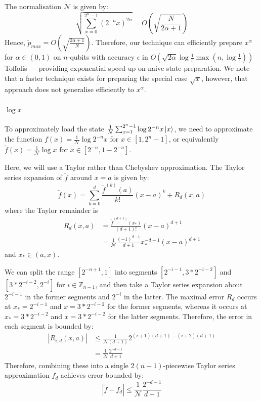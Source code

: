 The normalisation $\mathcal{N}$ is given by:
\begin{equation}
    \sqrt{\sum_{x=0}^{2^n-1}(2^{-n} x)^{2\alpha}}  = O\left(\sqrt{\frac{N}{2\alpha+1}}\right)
\end{equation}
Hence, $\tilde{p}_{max} = O\left(\sqrt{\frac{2\alpha+1}{N}
}\right)$. Therefore, our technique can efficiently prepare $x^{\alpha}$ for $\alpha \in (0,1)$ on $n$-qubits with accuracy $\epsilon$ in $O(\sqrt{2\alpha} \log \frac{1}{\epsilon}\max(n, \log\frac{1}{\epsilon}))$ Toffolis --- providing exponential speed-up on naive state preparation. We note that a faster technique \cite{PhysRevLett.122.020502} exists for preparing the special case $\sqrt{x}$, however, that approach does not generalise efficiently to $x^{\alpha}$.

\paragraph{$\log x$}
\label{section:inverse} To approximately load the state $\frac{1}{\mathcal{N}}\sum_{x=1}^{2^n-1} \log{2^{-n}x}\ket{x}$, we need to approximate the function $f(x) = \frac{1}{\mathcal{N}}\log{2^{-n}x}$ for $x \in [1, 2^n-1]$, or equivalently $\tilde f(x) =\frac{1}{\mathcal{N}}\log{x}$ for $x \in [2^{-n}, 1-2^{-n}]$. 

Here, we will use a Taylor rather than Chebyshev approximation. The Taylor series expansion of $\tilde f$ around $x=a$ is given by:
\begin{equation}
        \tilde f(x) = \sum_{k=0}^d \frac{\tilde{f}^{(k)}(a)}{k!}(x-a)^k + R_d(x,a)
\end{equation}
where the Taylor remainder is
\begin{align}
    R_d(x,a) &= \frac{\tilde{f}^{(d+1)}(x_*)}{(d+1)!}(x-a)^{d+1} \nonumber \\
            &= \frac{1}{\mathcal{N}} \frac{(-1)^{d-1}}{d+1} x_*^{-d-1}(x-a)^{d+1}
\end{align}
and $x_* \in (a,x)$.

We can split the range $[2^{-n+1}, 1]$ into segments $[2^{-i-1}, 3*2^{-i-2}]$ and $[3*2^{-i-2}, 2^{-i}]$ for $i \in \mathbb{Z}_{n-1}$, and then take a Taylor series expansion about $2^{-i-1}$ in the former segments and $2^{-i}$ in the latter. The maximal error $R_d$ occurs at $x_* = 2^{-i-1}$ and $x=3*2^{-i-2}$ for the former segments, whereas it occurs at $x_* = 3*2^{-i-2}$ and $x=3*2^{-i-2}$ for the latter segments. Therefore, the error in each segment is bounded by:
\begin{align}
    |R_{i,d}(x,a)| &\leq \frac{1}{\mathcal{N}(d+1)}  2^{(i+1)(d+1)-(i+2)(d+1)} \nonumber\\
                &= \frac{1}{\mathcal{N}} \frac{2^{-d-1}}{d+1}
\end{align}
Therefore, combining these into a single $2(n-1)$-piecewise Taylor series approximation $f_d$ achieves error bounded by:
\begin{equation}
     |\tilde f - f_{d}| \leq   \frac{1}{\mathcal{N}} \frac{2^{-d-1}}{d+1}
\end{equation}

